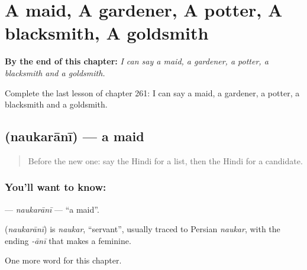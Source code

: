 
\chapter{A maid, A gardener, A potter, A blacksmith, A goldsmith}
\label{ch:hi-a-maid-a-gardener-a-potter-a-blacksmith-a-goldsmith}

\begin{chapteropening}
\textbf{By the end of this chapter:} \emph{I can say a maid, a gardener, a potter, a blacksmith and a goldsmith.}

Complete the last lesson of chapter 261: I can say a maid, a gardener, a potter, a blacksmith and a goldsmith.
\end{chapteropening}

\section[\texorpdfstring{\hi{नौकरानी} (naukarānī)}{नौकरानी (naukarānī)}]{ (naukarānī) — a maid}

\label{lesson:HI-C261-naukarani}



\begin{quote}
Before the new one: say the Hindi for a list, then the Hindi for a candidate.
\end{quote}

\subsection*{You'll want to know: }
\textbf{} — \emph{naukarānī} — \textquotedblleft{}a maid\textquotedblright{}.

\begin{cousinweb}
\textbf{} (\emph{naukarānī}) is \emph{naukar}, \textquotedblleft{}servant\textquotedblright{}, usually traced to Persian \emph{naukar}, with the ending \emph{-ānī} that makes a feminine.
\end{cousinweb}

\begin{grammarlens}[title={What you've built}]
One more word for this chapter.
\end{grammarlens}

